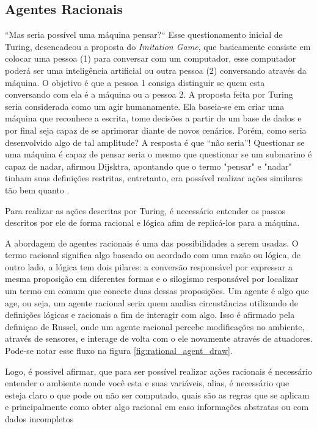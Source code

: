 \subsection{Agentes Racionais}
“Mas seria possível uma máquina pensar?“ Esse questionamento inicial de Turing, desencadeou a proposta do \textit{Imitation Game}, que basicamente consiste em colocar uma pessoa (1) para conversar com um computador, esse computador poderá ser uma inteligência artificial ou outra pessoa (2) conversando através da máquina. O objetivo é que a pessoa 1 consiga distinguir se quem esta conversando com ela é a máquina ou a pessoa 2. A proposta feita por Turing seria considerada como um agir humanamente. Ela baseia-se em criar uma máquina que reconhece a escrita, tome decisões a partir de um base de dados e por final seja capaz de se aprimorar diante de novos cenários. Porém, como seria desenvolvido algo de tal amplitude? A resposta é que “não seria”! Questionar se uma máquina é capaz de pensar seria o mesmo que questionar se um submarino é capaz de nadar, afirmou Dijsktra, apontando que o termo "pensar" e "nadar" tinham suas definições restritas, entretanto, era possível realizar ações similares tão bem quanto \cite[2-3]{dijkstra898, turing1950, russell2003artificial}.

Para realizar as ações descritas por Turing, é necessário entender os passos descritos por ele de forma racional e lógica afim de replicá-los para a máquina.

A abordagem de agentes racionais é uma das possibilidades a serem usadas. O termo racional significa algo baseado ou acordado com uma razão ou lógica, de outro lado, a lógica tem dois pilares: a conversão responsável por expressar a mesma proposição em diferentes formas e o silogismo responsável por localizar um termo em comum que conecte duas dessas proposições. Um agente é algo que age, ou seja, um agente racional seria quem analisa circustâncias utilizando de definições lógicas e racionais a fim de interagir com algo. Isso é afirmado pela definiçao de Russel\cite[7]{russell2003artificial}, onde um agente racional percebe modificações no ambiente, através de sensores, e interage de volta com o ele novamente através de atuadores. Pode-se notar esse fluxo na figura \ref{fig:rational_agent_draw}.

Logo, é possivel afirmar, que para ser possível realizar ações racionais é necessário entender o ambiente aonde você esta e suas variáveis, alias, é necessário que esteja claro o que pode ou não ser computado, quais são as regras que se aplicam e principalmente como obter algo racional em caso informações abstratas ou com dados incompletos \cite{frege1956thought, wooldridge1994agent, simon1955behavioral, boole1854investigation, russell2003artificial}

